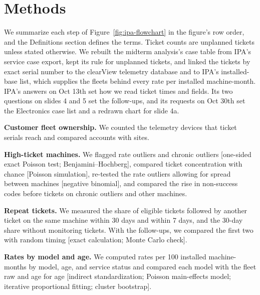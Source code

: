 
\section{Methods}
We summarize each step of Figure~\ref{fig:ipa-flowchart} in the figure's row order, and the Definitions section defines the terms. Ticket counts are unplanned tickets unless stated otherwise. We rebuilt the midterm analysis's case table from IPA's service case export, kept its rule for unplanned tickets, and linked the tickets by exact serial number to the clearView telemetry database and to IPA's installed-base list, which supplies the fleets behind every rate per installed machine-month. IPA's answers on Oct 13th set how we read ticket times and fields. Its two questions on slides 4 and 5 set the follow-ups, and its requests on Oct 30th set the Electronics case list and a redrawn chart for slide 4a.

\smallskip\noindent\textbf{Customer fleet ownership.}
We counted the telemetry devices that ticket serials reach and compared accounts with sites.

\smallskip\noindent\textbf{High-ticket machines.}
We flagged rate outliers and chronic outliers [one-sided exact Poisson test; Benjamini--Hochberg], compared ticket concentration with chance [Poisson simulation], re-tested the rate outliers allowing for spread between machines [negative binomial], and compared the rise in non-success codes before tickets on chronic outliers and other machines.

\smallskip\noindent\textbf{Repeat tickets.}
We measured the share of eligible tickets followed by another ticket on the same machine within 30 days and within 7 days, and the 30-day share without monitoring tickets. With the follow-ups, we compared the first two with random timing [exact calculation; Monte Carlo check].

\smallskip\noindent\textbf{Rates by model and age.}
We computed rates per 100 installed machine-months by model, age, and service status and compared each model with the fleet raw and age for age [indirect standardization; Poisson main-effects model; iterative proportional fitting; cluster bootstrap].

